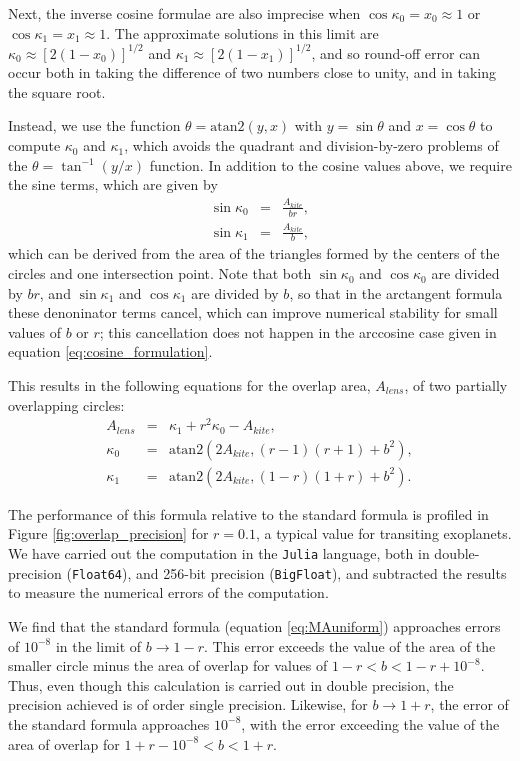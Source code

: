 \documentclass[modern]{aastex61}
\begin{document}
Next, the inverse cosine formulae are also imprecise when $\cos{\kappa_0} = x_0 \approx
1$ or $\cos{\kappa_1} = x_1 \approx 1$.  The approximate solutions in this limit
are $\kappa_0 \approx [2(1-x_0)]^{1/2}$ and $\kappa_1 \approx [2(1-x_1)]^{1/2}$, and so round-off
error can occur both in taking the difference of two numbers close to unity,
and in taking the square root.

Instead, we use the function $\theta = \mathrm{atan2}(y,x)$ with $y=\sin{\theta}$ and
$x=\cos{\theta}$ to compute $\kappa_0$ and $\kappa_1$, which avoids the quadrant and
division-by-zero problems of the $\theta = \tan^{-1}(y/x)$ function.  In addition
to the cosine values above, we require the sine terms, which are given by
\begin{eqnarray}
\sin{\kappa_0} &=& \frac{A_{kite}}{br},\\
\sin{\kappa_1} &=& \frac{A_{kite}}{b},
\end{eqnarray}
which can be derived from the area of the triangles formed by the centers of
the circles and one intersection point.
Note that both $\sin{\kappa_0}$ and $\cos{\kappa_0}$ are divided by $br$, and
$\sin{\kappa_1}$ and $\cos{\kappa_1}$ are divided by $b$, so that
in the arctangent formula these denoninator terms cancel, which can improve
numerical stability for small values of $b$ or $r$; this cancellation does not happen
in the arccosine case given in equation \ref{eq:cosine_formulation}.

This results in the following equations for the overlap area, $A_{lens}$, of two 
partially overlapping circles:
\begin{eqnarray} \label{eq:area_of_overlap}
A_{lens} &=& \kappa_1 + r^2\kappa_0 - A_{kite},\\
\kappa_0 &=& \mathrm{atan2}(2A_{kite},(r-1)(r+1)+b^2),\\
\kappa_1 &=& \mathrm{atan2}(2A_{kite},(1-r)(1+r)+b^2).
\end{eqnarray}

The performance of this formula relative to the standard formula is profiled
in Figure \ref{fig:overlap_precision} for $r=0.1$, a typical
value for transiting exoplanets.  We have carried out
the computation in the \texttt{Julia} language, both in double-precision
(\texttt{Float64}), and 256-bit precision (\texttt{BigFloat}), and
subtracted the results to measure the numerical errors of the computation.

We find that the standard
formula (equation \ref{eq:MAuniform}) approaches errors of $10^{-8}$
in the limit of $b \rightarrow 1-r$. This error exceeds the value
of the area of the smaller circle minus the area of overlap for
values of $1-r < b < 1-r+10^{-8}$.  Thus, even though this calculation
is carried out in double precision, the precision achieved is of
order single precision.  Likewise, for $b \rightarrow 1+r$,
the error of the standard formula approaches $10^{-8}$, with the
error exceeding the value of the area of overlap for $1+r-10^{-8} <
b < 1+r$.
\end{document}
